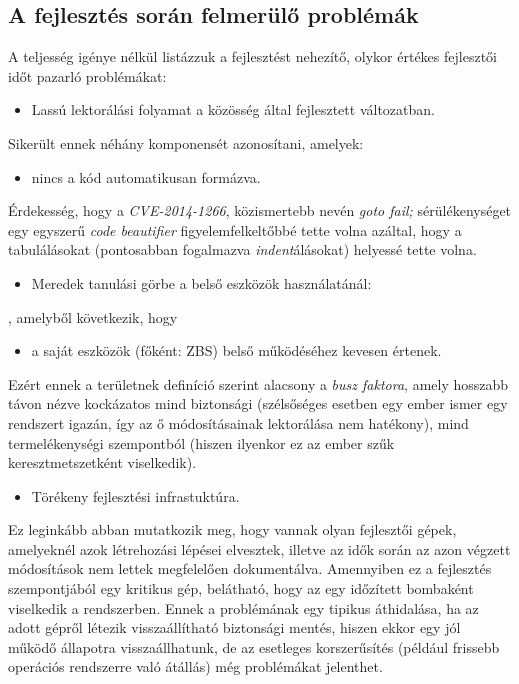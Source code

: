 \subsection{A fejlesztés során felmerülő problémák}

A teljesség igénye nélkül listázzuk a fejlesztést nehezítő, olykor értékes fejlesztői időt pazarló
problémákat:
\begin{itemize}
    \item Lassú lektorálási folyamat a közösség által fejlesztett változatban.
\end{itemize}
Sikerült ennek néhány komponensét azonosítani, amelyek:

\begin{itemize}
    \item nincs a kód automatikusan formázva.
\end{itemize}
Érdekesség, hogy a \emph{CVE-2014-1266}, közismertebb nevén \emph{goto fail;} sérülékenységet egy
egyszerű \emph{code beautifier} figyelemfelkeltőbbé tette volna azáltal, hogy a tabulálásokat
(pontosabban fogalmazva \emph{indent}álásokat) helyessé tette volna.

\begin{itemize}
    \item Meredek tanulási görbe a belső eszközök használatánál:
\end{itemize}
, amelyből következik, hogy
\begin{itemize}
    \item a saját eszközök (főként: ZBS) belső működéséhez kevesen értenek.
\end{itemize}
Ezért ennek a területnek definíció szerint alacsony a \emph{busz faktora}, amely hosszabb távon
nézve kockázatos mind biztonsági (szélsőséges esetben egy ember ismer egy rendszert igazán, így az
ő módosításainak lektorálása nem hatékony), mind termelékenységi szempontból (hiszen ilyenkor
ez az ember szűk keresztmetszetként viselkedik).

\begin{itemize}
    \item Törékeny fejlesztési infrastuktúra.
\end{itemize}
Ez leginkább abban mutatkozik meg, hogy vannak olyan fejlesztői gépek, amelyeknél azok létrehozási
lépései elvesztek, illetve az idők során az azon végzett módosítások nem lettek megfelelően
dokumentálva. Amennyiben ez a fejlesztés szempontjából egy kritikus gép, belátható, hogy az egy
időzített bombaként viselkedik a rendszerben. Ennek a problémának egy tipikus áthidalása, ha az
adott gépről létezik visszaállítható biztonsági mentés, hiszen ekkor egy jól működő állapotra
visszaállhatunk, de az esetleges korszerűsítés (például frissebb operációs rendszerre való átállás)
még problémákat jelenthet.


